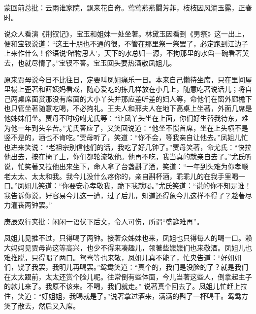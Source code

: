 \begin{parag}
    \begin{note}蒙回前总批：云雨谁家院，飘来花自奇。莺莺燕燕闘芳菲，枝枝因风滴玉露，正春时。\end{note}
\end{parag}


\begin{parag}
    说众人看演《荆钗记》，宝玉和姐妹一处坐著。林黛玉因看到《男祭》这一出上，便和宝钗说道：“这王十朋也不通的很，不管在那里祭一祭罢了，必定跑到江边子上来作什么！俗语说‘睹物思人’，天下的水总归一源，不拘那里的水舀一碗看著哭去，也就尽情了。”宝钗不答。宝玉回头要热酒敬凤姐儿。
\end{parag}


\begin{parag}
    原来贾母说今日不比往日，定要叫凤姐痛乐一日。本来自己懒待坐席，只在里间屋里榻上歪著和薛姨妈看戏，随心爱吃的拣几样放在小几上，随意吃著说话儿；将自己两桌席面赏那没有席面的大小丫头并那应差听差的妇人等，命他们在窗外廊檐下也只管坐著随意吃喝，不必拘礼。王夫人和邢夫人在地下高桌上坐著，外面几席是他姊妹们坐。贾母不时吩咐尤氏等：“让凤丫头坐在上面，你们好生替我待东，难为他一年到头辛苦。”尤氏答应了，又笑回说道：“他坐不惯首席，坐在上头横不是竖不是的，酒也不肯吃。”贾母听了，笑道：“你不会，等我亲自让他去。”凤姐儿忙也进来笑说：“老祖宗别信他们的话，我吃了好几钟了。”贾母笑著，命尤氏：“快拉他出去，按在椅子上，你们都轮流敬他。他再不吃，我当真的就亲自去了。”尤氏听说，忙笑著又拉他出来坐下，命人拿了台盏斟了酒，笑道：“一年到头难为你孝顺老太太、太太和我。我今儿没什么疼你的，亲自斟杯酒，乖乖儿的在我手里喝一口。”凤姐儿笑道：“你要安心孝敬我，跪下我就喝。”尤氏笑道：“说的你不知是谁！我告诉你说，好容易今儿这一遭，过了后儿，知道还得象今儿这样不得了？趁著尽力灌丧两钟罢。”\begin{note}庚辰双行夹批：闲闲一语伏下后文，令人可伤，所谓“盛筵难再”。\end{note}凤姐儿见推不过，只得喝了两钟。接著众姊妹也来，凤姐也只得每人的喝一口。赖大妈妈见贾母尚这等高兴，也少不得来凑趣儿，领著些嬷嬷们也来敬酒。凤姐儿也难推脱，只得喝了两口。鸳鸯等也来敬，凤姐儿真不能了，忙央告道：“好姐姐们，饶了我罢，我明儿再喝罢。”鸳鸯笑道：“真个的，我们是没脸的了？就是我们在太太跟前，太太还赏个脸儿呢。往常倒有些体面，今儿当著这些人，倒拿起主子的款儿来了。我原不该来。不喝，我们就走。” 说著真个回去了。凤姐儿忙赶上拉住，笑道：“好姐姐，我喝就是了。”说著拿过酒来，满满的斟了一杯喝干。鸳鸯方笑了散去，然后又入席。
\end{parag}


